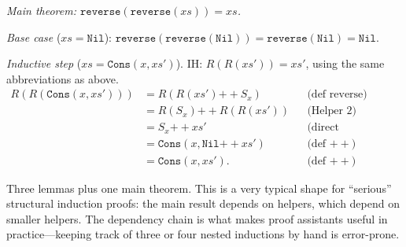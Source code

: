 \documentclass[11pt]{article}
\begin{document}
\emph{Main theorem: $\texttt{reverse}(\texttt{reverse}(xs)) = xs$.}

\emph{Base case} ($xs = \texttt{Nil}$): $\texttt{reverse}(\texttt{reverse}(\texttt{Nil})) = \texttt{reverse}(\texttt{Nil}) = \texttt{Nil}$. \checkmark

\emph{Inductive step} ($xs = \texttt{Cons}(x, xs')$). IH:
$R(R(xs')) = xs'$, using the same abbreviations as above.
\begin{align*}
  R(R(\texttt{Cons}(x, xs')))
    &= R(R(xs') \mathbin{++} S_x) && \text{(def reverse)} \\
    &= R(S_x) \mathbin{++} R(R(xs')) && \text{(Helper 2)} \\
    &= S_x \mathbin{++} xs' && \text{(direct computation and IH)} \\
    &= \texttt{Cons}(x, \texttt{Nil} \mathbin{++} xs') && \text{(def $\mathbin{++}$)} \\
    &= \texttt{Cons}(x, xs'). && \text{(def $\mathbin{++}$)}
\end{align*}
\checkmark

Three lemmas plus one main theorem. This is a very typical shape for ``serious'' structural induction proofs: the main result depends on helpers, which depend on smaller helpers. The dependency chain is what makes proof assistants useful in practice---keeping track of three or four nested inductions by hand is error-prone.
\end{document}
